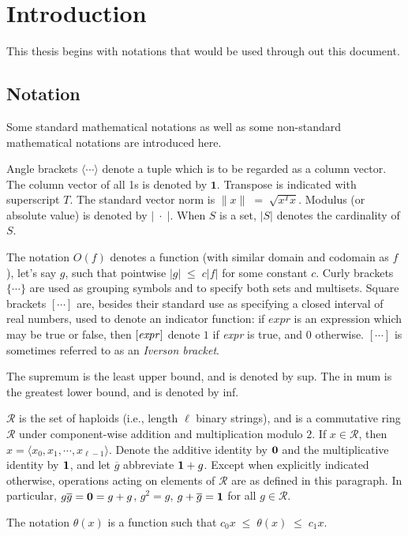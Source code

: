 \chapter{Introduction} \label{ch:introduction}
This thesis begins with notations that would be used through out this document.
\section{Notation}
Some standard mathematical notations as well as some non-standard mathematical notations are introduced here.

Angle brackets $\langle \cdots \rangle$ denote a tuple which is to be regarded as a column
vector. The column vector of all 1s is denoted by $\bm{1}$. Transpose is indicated with superscript $T$. 
The standard vector norm is $\|x\| \;=\; \sqrt{x^T x}$. Modulus (or absolute value) is denoted by $|\; \cdot \;|$. 
When $S$ is a set, $|S|$ denotes the cardinality of $S$.

The notation $O(f)$ denotes a function (with similar domain and codomain as
$f$), let's say $g$, such that pointwise $|g| \;\leq \;c |f|$ for some constant $c$. 
Curly brackets $\{\cdots\}$ are used as grouping symbols and to specify both sets
and multisets. Square brackets $[ \cdots ]$ are, besides their standard use as specifying 
a closed interval of real numbers, used to denote an indicator function:
if $expr$ is an expression which may be true or false, then
$[\mbox{\em expr\/} ]$ denote $1$ if {\em expr\/} is
true, and $0$ otherwise. $[ \cdots ]$ is sometimes referred to as an {\em Iverson bracket}. 

The supremum is the least upper bound, and is denoted by sup. The in mum
is the greatest lower bound, and is denoted by inf.

$\mathcal{R}$ is the set of haploids (i.e., length $\ell$ binary strings), and is a
commutative ring $\mathcal{R}$ under component-wise addition and
multiplication modulo $2$. If $x \in \mathcal{R}$, then $x = \langle x_0, x_1, \cdots, x_{\ell - 1} \rangle$. 
Denote the additive identity by ${\bf 0}$ and the
multiplicative identity by ${\bf 1}$, and let $\overline{g}$
abbreviate ${\bf 1} + g$.  Except when explicitly indicated otherwise,
operations acting on elements of $\mathcal{R}$ are as defined in this
paragraph. In particular, $g \overline{g} = {\bf 0} = g+g$,
  $g^2 = g$, $g + \overline{g} = {\bf 1}$ for all $g \in
  \mathcal{R}$.
  
The notation $\theta(x)$ is a function such that $c_0 x \;\leq\; \theta(x) \;\leq\; c_1 x$. 

